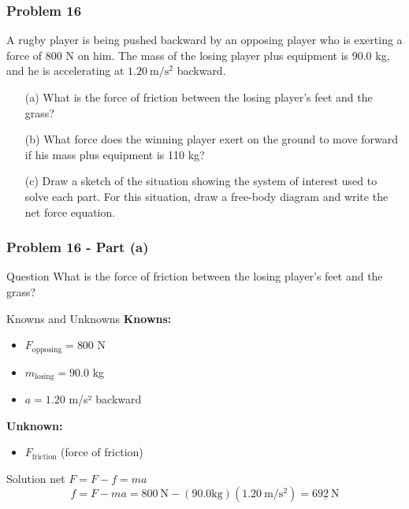 \documentclass{beamer}
\begin{document}
\begin{frame}
\frametitle{Problem 16}
A rugby player is being pushed backward by an opposing player who is exerting a force of 800 N on him. The mass of the losing player plus equipment is 90.0 kg, and he is accelerating at $1.20 \mathrm{~m} / \mathrm{s}^{2}$ backward.
\begin{itemize}
    \item[(a)] What is the force of friction between the losing player's feet and the grass?
    \item[(b)] What force does the winning player exert on the ground to move forward if his mass plus equipment is 110 kg?
    \item[(c)] Draw a sketch of the situation showing the system of interest used to solve each part. For this situation, draw a free-body diagram and write the net force equation.
\end{itemize}
\end{frame}

\begin{frame}
\frametitle{Problem 16 - Part (a)}
\begin{block}{Question}
What is the force of friction between the losing player's feet and the grass?
\end{block}
\begin{block}{Knowns and Unknowns}
\textbf{Knowns:}
\begin{itemize}
    \item $F_{\text{opposing}} = 800$ N
    \item $m_{\text{losing}} = 90.0$ kg
    \item $a = 1.20$ m/s² backward
\end{itemize}
\textbf{Unknown:}
\begin{itemize}
    \item $F_{\text{friction}}$ (force of friction)
\end{itemize}
\end{block}
\begin{block}{Solution}
net $F = F - f = ma$
\begin{equation*}
f = F - ma = 800 \mathrm{~N} - (90.0 \mathrm{kg})(1.20 \mathrm{~m} / \mathrm{s}^{2}) = \underline{692 \mathrm{~N}}
\end{equation*}
\end{block}
\end{frame}
\end{document}
